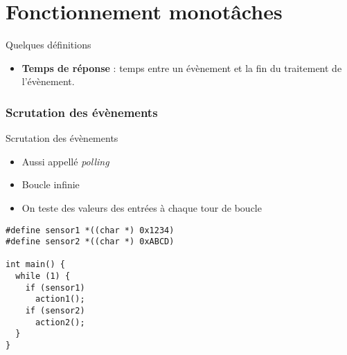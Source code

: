 %                                                                                                               
%
%


\part{Fonctionnement monotâches}

\begin{frame}{Quelques définitions}
  \begin{itemize}
  \item \textbf{Temps de réponse} : temps entre un évènement et la fin
    du traitement de l'évènement.
  \end{itemize} 
\end{frame}

\section{Scrutation des évènements}
\begin{frame}[fragile]{Scrutation des évènements}
  \begin{itemize} 
  \item Aussi appellé \emph{polling}
  \item Boucle infinie 
  \item On teste des valeurs des entrées à chaque tour de boucle
  \end{itemize} 
  \begin{lstlisting} 
#define sensor1 *((char *) 0x1234)
#define sensor2 *((char *) 0xABCD)

int main() {
  while (1) {
    if (sensor1)
      action1();
    if (sensor2)
      action2();
  }
}
  \end{lstlisting} 
\end{frame}


